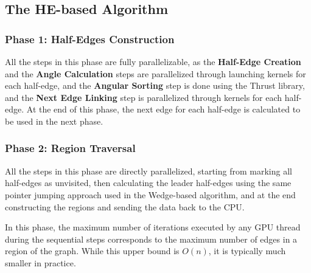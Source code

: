 \subsection{The HE-based Algorithm}

\subsubsection{Phase 1: Half-Edges Construction}
All the steps in this phase are fully parallelizable, as the \textbf{Half-Edge Creation} and the \textbf{Angle Calculation} steps are parallelized through launching kernels for each half-edge, and the \textbf{Angular Sorting} step is done using the Thrust library, and the \textbf{Next Edge Linking} step is parallelized through kernels for each half-edge. At the end of this phase, the next edge for each half-edge is calculated to be used in the next phase.

\subsubsection{Phase 2: Region Traversal}
All the steps in this phase are directly parallelized, starting from marking all half-edges as unvisited, then calculating the leader half-edges using the same pointer jumping approach used in the Wedge-based algorithm, and at the end constructing the regions and sending the data back to the CPU.

In this phase, the maximum number of iterations executed by any GPU thread during the sequential steps corresponds to the maximum number of edges in a region of the graph. While this upper bound is \(O(n)\), it is typically much smaller in practice.